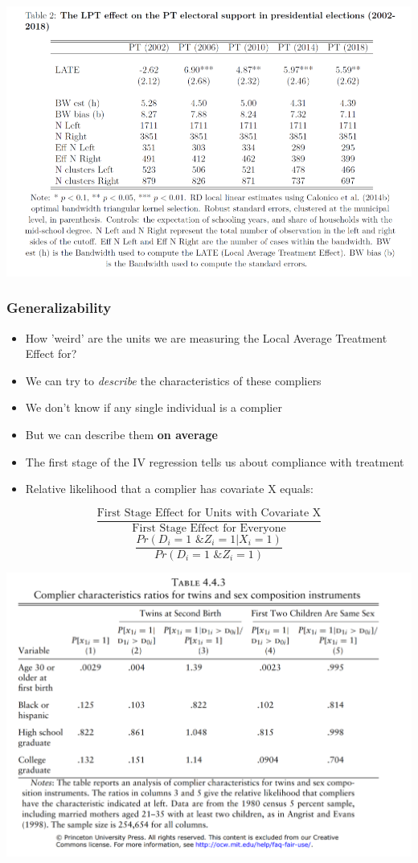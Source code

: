 \documentclass[xcolor=x11names,compress]{beamer}\usepackage[]{graphicx}\usepackage[]{color}
\renewcommand{\(}{\begin{columns}}
\renewcommand{\)}{\end{columns}}
\newcommand{\<}[1]{\begin{column}{#1}}
\renewcommand{\>}{\end{column}}
\begin{document}
\begin{frame}
\includegraphics[scale=0.5]{placebo.png}
\end{frame}

\begin{frame}
\frametitle{Generalizability}
\begin{itemize}
\item How 'weird' are the units we are measuring the Local Average Treatment Effect for?
\pause
\item We can try to \textit{describe} the characteristics of these compliers
\pause
\item We don't know if any single individual is a complier
\pause
\item But we can describe them \textbf{on average}
\pause
\item The first stage of the IV regression tells us about compliance with treatment
\pause
\item Relative likelihood that a complier has covariate X equals:
\end{itemize}
\pause
$$\frac{\text{First Stage Effect for Units with Covariate X}}{\text{First Stage Effect for Everyone}}$$
\pause
$$\frac{Pr(D_i=1\text{ \& }Z_i=1 | X_i=1)}{Pr(D_i=1\text{ \& }Z_i=1)}$$
\end{frame}

\begin{frame}
\includegraphics[width=\linewidth]{twins_compliers.png}
\end{frame}
\end{document}
